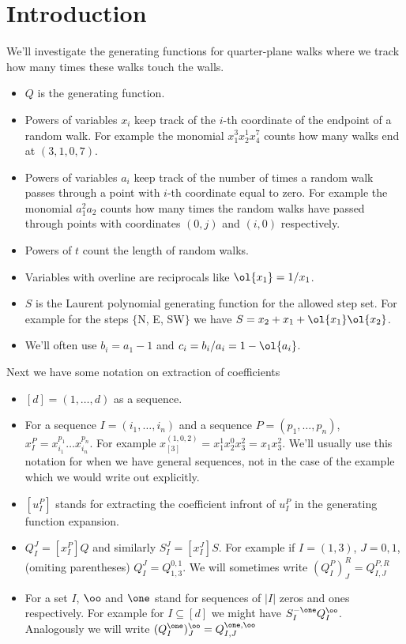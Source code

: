 
\chapter{Introduction}
\label{ch:Intro}

We'll investigate the generating functions for quarter-plane walks where we track how many times these walks touch the walls. 
\begin{itemize}
\item $Q$ is the generating function.
\item Powers of variables $x_i$ keep track of the $i$-th coordinate of the endpoint of a random walk. For example the monomial $x_1^3x_2^1x_4^7$ counts how many walks end at $(3,1,0,7)$.
\item Powers of variables $a_i$ keep track of the number of times a random walk passes through a point with $i$-th coordinate equal to zero. For example the monomial $a_1^2a_2$ counts how many times the random walks have passed through points with coordinates $(0,j)$ and $(i,0)$ respectively.
\item Powers of $t$ count the length of random walks.
\item Variables with overline are reciprocals like $\ol{x_1} = 1/x_1$.
\item $S$ is the Laurent polynomial generating function for the allowed step set. For example for the steps $\{$N, E, SW$\}$ we have $S = x_2 + x_1+\ol{x_1}\ol{x_2}$.
\item We'll often use $b_i = a_1-1$ and $c_i = b_i/a_i = 1-\ol{a_i}$.
\end{itemize}
Next we have some notation on extraction of coefficients
\begin{itemize}
\item $[d] = (1,\ldots,d)$ as a sequence.
\item For a sequence $I = (i_1,\ldots, i_n)$ and a sequence $P = (p_1,\ldots,p_n)$, $x_I^P = x_{i_1}^{p_1}\ldots x_{i_n}^{p_n}$. For example $x_{[3]}^{(1,0,2)} = x_1^1x_2^0x_3^2 = x_1x_3^2$. We'll usually use this notation for when we have general sequences, not in the case of the example which we would write out explicitly.
\item $[u_I^P]$ stands for extracting the coefficient infront of $u_I^P$ in the generating function expansion.
\item $Q_{I}^J = [x_I^P]Q$ and similarly $S_I^J =[x_I^J]S$. For example if $I = (1,3)$, $J = {0,1}$, (omiting parentheses) $Q_I^J = Q_{1,3}^{0,1}$. We will sometimes write $(Q_I^P)_J^R = Q_{I,J}^{P,R}$
\item For a set $I$, $\oo$ and $\one$ stand for sequences of $|I|$ zeros and ones respectively. For example for $I \subseteq [d]$ we might have $S_I^{-\one}Q_I^{\oo}$. Analogously we will write $(Q_I^{\one})_J^\oo = Q_{I,J}^{\one,\oo}$
\end{itemize}
